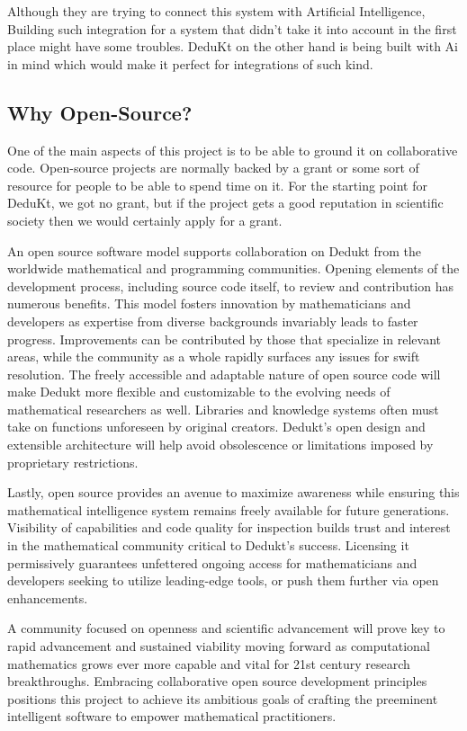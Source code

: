 \documentclass[9pt,a4paper,twocolumn]{article}
\begin{document}
        Although they are trying to connect this system with Artificial Intelligence, Building such integration for a system that didn't take it into account in the first place might have some troubles. DeduKt on the other hand is being built with Ai in mind which would make it perfect for integrations of such kind.  

    \subsection{Why Open-Source?}
        One of the main aspects of this project is to be able to ground it on collaborative code. Open-source projects are normally backed by a grant or some sort of resource for people to be able to spend time on it. For the starting point for DeduKt, we got no grant, but if the project gets a good reputation in scientific society then we would certainly apply for a grant.
        
        An open source software model supports collaboration on Dedukt from the worldwide mathematical and programming communities. Opening elements of the development process, including source code itself, to review and contribution has numerous benefits. This model fosters innovation by mathematicians and developers as expertise from diverse backgrounds invariably leads to faster progress. Improvements can be contributed by those that specialize in relevant areas, while the community as a whole rapidly surfaces any issues for swift resolution. The freely accessible and adaptable nature of open source code will make Dedukt more flexible and customizable to the evolving needs of mathematical researchers as well. Libraries and knowledge systems often must take on functions unforeseen by original creators. Dedukt's open design and extensible architecture will help avoid obsolescence or limitations imposed by proprietary restrictions.

        Lastly, open source provides an avenue to maximize awareness while ensuring this mathematical intelligence system remains freely available for future generations. Visibility of capabilities and code quality for inspection builds trust and interest in the mathematical community critical to Dedukt's success. Licensing it permissively guarantees unfettered ongoing access for mathematicians and developers seeking to utilize leading-edge tools, or push them further via open enhancements.
        
        A community focused on openness and scientific advancement will prove key to rapid advancement and sustained viability moving forward as computational mathematics grows ever more capable and vital for 21st century research breakthroughs. Embracing collaborative open source development principles positions this project to achieve its ambitious goals of crafting the preeminent intelligent software to empower mathematical practitioners.
\end{document}
